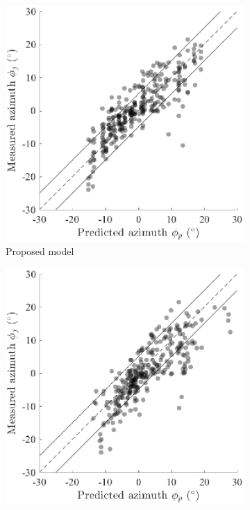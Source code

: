 \begin{figure}[t]
\centering
  \begin{subfigure}[b]{0.49\columnwidth}
        \includegraphics[width=\textwidth]{05_proposed_models/figures/LocalizationModelResults}
        \caption{Proposed model}
        \label{fig:Localization_Model_Results}
  \end{subfigure}
  \hfill
  \begin{subfigure}[b]{0.49\columnwidth}
        \includegraphics[width=\textwidth]{05_proposed_models/figures/DietzLocalizationResults}

\end{subfigure}
\end{figure}
